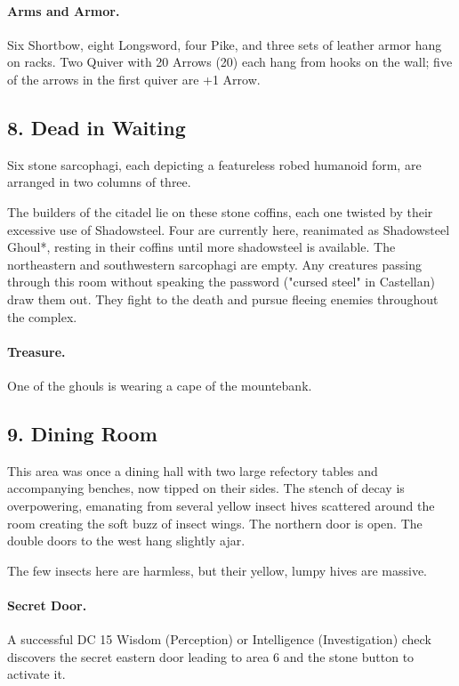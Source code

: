 \documentclass[10pt,a4paper,twoside,twocolumn,openany,bg=print,nodeprecatedcode]{dndbook}
\begin{document}
\paragraph{Arms and Armor.}
Six Shortbow, eight Longsword, four Pike, and three sets of leather armor hang on racks. Two Quiver with 20 Arrows (20) each hang from hooks on the wall; five of the arrows in the first quiver are +1 Arrow.
\subsection{8. Dead in Waiting}
\begin{DndReadAloud}{}
Six stone sarcophagi, each depicting a featureless robed humanoid form, are arranged in two columns of three.
\end{DndReadAloud}

The builders of the citadel lie on these stone coffins, each one twisted by their excessive use of Shadowsteel. Four are currently here, reanimated as Shadowsteel Ghoul*, resting in their coffins until more shadowsteel is available. The northeastern and southwestern sarcophagi are empty. Any creatures passing through this room without speaking the password ("cursed steel" in Castellan) draw them out. They fight to the death and pursue fleeing enemies throughout the complex.
\paragraph{Treasure.}
One of the ghouls is wearing a cape of the mountebank.
\subsection{9. Dining Room}
\begin{DndReadAloud}{}
This area was once a dining hall with two large refectory tables and accompanying benches, now tipped on their sides. The stench of decay is overpowering, emanating from several yellow insect hives scattered around the room creating the soft buzz of insect wings. The northern door is open. The double doors to the west hang slightly ajar.
\end{DndReadAloud}

The few insects here are harmless, but their yellow, lumpy hives are massive.
\paragraph{Secret Door.}
A successful DC 15 Wisdom (Perception) or Intelligence (Investigation) check discovers the secret eastern door leading to area 6 and the stone button to activate it.
\end{document}

